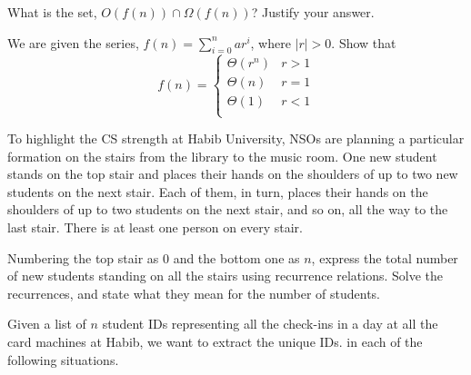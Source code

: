 \documentclass[addpoints]{exam}
\begin{document}
\begin{questions}
  \begin{solution}
    \begin{parts}
      \part 
      \part 
    \end{parts}
  \end{solution}
  
  \question[5] What is the set, $O(f(n)) \cap \Omega(f(n))$? Justify your answer.
  
  \begin{solution}
  \end{solution}
  
  \question[5] We are given the series, $f(n) = \sum_{i=0}^nar^i$, where $|r|>0$. Show that
  \[
    f(n) =
    \begin{cases}
      \Theta(r^n) & r > 1\\
      \Theta(n) & r = 1\\
      \Theta(1) & r < 1\\
    \end{cases}
  \]
  
  \begin{solution}
  \end{solution}

  \question[5] To highlight the CS strength at Habib University, NSOs are planning a particular formation on the stairs from the library to the music room. One new student stands on the top stair and places their hands on the shoulders of up to two new students on the next stair. Each of them, in turn, places their hands on the shoulders of up to two students on the next stair, and so on, all the way to the last stair. There is at least one person on every stair.

  Numbering the top stair as $0$ and the bottom one as $n$, express the total number of new students standing on all the stairs using recurrence relations. Solve the recurrences, and state what they mean for the number of students.
  
  \begin{solution}
  \end{solution}
  
  \question Given a list of $n$ student IDs representing all the check-ins in a day at all the card machines at Habib, we want to extract the unique IDs. in each of the following situations. 
  \begin{parts}

\end{parts}
\end{questions}
\end{document}
